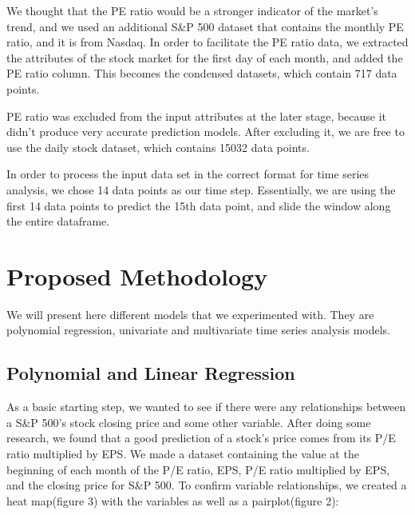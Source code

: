 \documentclass{article}
\begin{document}
We thought that the PE ratio would be a stronger indicator of the market’s trend, and we used an additional S\&P 500 dataset that contains the monthly PE ratio\cite{SNP_PE_Monthly}, and it is from Nasdaq. In order to facilitate the PE ratio data, we extracted the attributes of the stock market for the first day of each month, and added the PE ratio column. This becomes the condensed datasets, which contain 717 data points.

PE ratio was excluded from the input attributes at the later stage, because it didn’t produce very accurate prediction models. After excluding it, we are free to use the daily stock dataset, which contains 15032 data points.

In order to process the input data set in the correct format for time series analysis, we chose 14 data points as our time step. Essentially, we are using the first 14 data points to predict the 15th data point, and slide the window along the entire dataframe. 
 


\section{Proposed Methodology} 

We will present here different models that we experimented with. They are polynomial regression, univariate and multivariate time series analysis models. 

\subsection{Polynomial and Linear Regression}

As a basic starting step, we wanted to see if there were any relationships between a S\&P 500’s stock closing price and some other variable. After doing some research, we found that a good prediction of a stock's price comes from its P/E ratio multiplied by EPS. We made a dataset containing the value at the beginning of each month of the P/E ratio, EPS, P/E ratio multiplied by EPS, and the closing price for S\&P 500. To confirm variable relationships, we created a heat map(figure 3) with the variables as well as a pairplot(figure 2):
\end{document}
